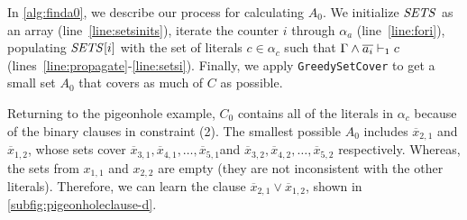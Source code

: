In \autoref{alg:finda0}, we describe our process for calculating $A_0$. 
We initialize ${\it SETS}$ as an array (line~\ref{line:setsinits}), iterate the counter $i$ through
$\alpha_a$ (line~\ref{line:fori}), populating ${\it SETS}[i]$ with the set of literals $c \in \alpha_c$
such that $\Gamma \land \overline{a_i} \vdash_1 c$ (lines~\ref{line:propagate}-\ref{line:setsi}). Finally, we apply
\texttt{GreedySetCover} to get a small set $A_0$ that covers as much of $C$ as
possible.

Returning to the pigeonhole example, $C_0$ contains all of the literals in
$\alpha_c$ because of the binary clauses in constraint (2). The smallest
possible $A_0$ includes $\overline{x}_{2, 1}$ and $\overline{x}_{1, 2}$, whose
sets cover $\overline{x}_{3, 1}, \overline{x}_{4, 1},  \ldots, \overline{x}_{5,
1}$and  $\overline{x}_{3, 2}, \overline{x}_{4, 2},  \ldots, \overline{x}_{5, 2}$
respectively. Whereas, the sets from $x_{1, 1}$ and $x_{2, 2}$ are empty (they
are not inconsistent with the other literals). Therefore, we can learn the
clause $\overline{x}_{2, 1} \lor \overline{x}_{1, 2}$, shown in
\autoref{subfig:pigeonholeclause-d}.






